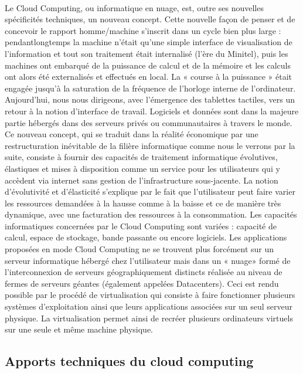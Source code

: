 \documentclass[a4paper, 12pt]{report}
\begin{document}
\begin{itemize}
\paragraph{}
Le Cloud Computing, ou informatique en nuage, est, outre ses nouvelles
spécificités techniques, un nouveau concept. Cette nouvelle façon de penser et de
concevoir le rapport homme/machine s'inscrit dans un cycle bien plus large : pendantlongtemps la machine n'était qu'une simple interface de visualisation de l'information et tout son traitement était internalisé (l'ère du Minitel), puis les machines ont
embarqué de la puissance de calcul et de la mémoire et les calculs ont alors été externalisés et effectués en local. La « course à la puissance » était engagée jusqu'à la saturation de la fréquence de l'horloge interne de l'ordinateur. Aujourd'hui, nous nous dirigeons, avec l'émergence des tablettes tactiles, vers un retour à la notion d'interface de travail. Logiciels et données sont dans la majeure partie hébergés dans des serveurs privés ou communautaires à travers le monde.
Ce nouveau concept, qui se traduit dans la réalité économique par une restructuration inévitable de la filière informatique comme nous le verrons par la suite, consiste à fournir des capacités de traitement informatique évolutives, élastiques et mises à disposition comme un service pour les utilisateurs qui y accèdent via internet sans gestion de l'infrastructure sous-jacente. La notion d'évolutivité et d'élasticité s'explique par le fait que l'utilisateur peut faire varier les ressources demandées à la
hausse comme à la baisse et ce de manière très dynamique, avec une facturation des ressources à la consommation. Les capacités informatiques concernées par le Cloud Computing sont variées : capacité de calcul, espace de stockage, bande passante ou
encore logiciels.
Les applications proposées en mode Cloud Computing ne se trouvent plus forcément sur un serveur informatique hébergé chez l'utilisateur mais dans un « nuage» formé de l'interconnexion de serveurs géographiquement distincts réalisée au niveau
de fermes de serveurs géantes (également appelées Datacenters). Ceci est rendu possible par le procédé de virtualisation qui consiste à faire fonctionner plusieurs systèmes d'exploitation ainsi que leurs applications associées sur un seul serveur
physique. La virtualisation permet ainsi de recréer plusieurs ordinateurs virtuels sur une seule et même machine physique.

\subsection{Apports techniques du cloud computing }
	

\end{itemize}
\end{document}
